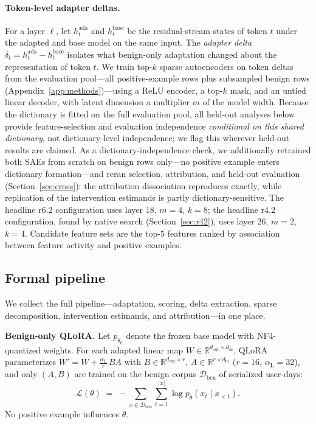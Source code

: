 \documentclass[10pt]{article} %
\newcommand{\rsix}{r6.2}
\newcommand{\rfour}{r4.2}
\begin{document}
\paragraph{Token-level adapter deltas.}
For a layer $\ell$, let $h^{\mathrm{ada}}_{t}$ and $h^{\mathrm{base}}_{t}$ be
the residual-stream states of token $t$ under the adapted and base model on the
same input. The \emph{adapter delta} $\delta_t = h^{\mathrm{ada}}_{t} -
h^{\mathrm{base}}_{t}$ isolates what benign-only adaptation changed about the
representation of token $t$. We train top-$k$ sparse autoencoders
\citep{gao2024scaling} on token deltas from the evaluation pool---all
positive-example rows plus subsampled benign rows
(Appendix~\ref{app:methods})---using a ReLU encoder, a top-$k$ mask, and an
untied linear decoder, with latent dimension a multiplier $m$ of the model
width. Because the dictionary is fitted on the full evaluation pool, all
held-out analyses below provide feature-selection and evaluation independence
\emph{conditional on this shared dictionary}, not dictionary-level
independence; we flag this wherever held-out results are claimed. As a
dictionary-independence check, we additionally retrained both SAEs from
scratch on benign rows only---no positive example enters dictionary
formation---and reran selection, attribution, and held-out evaluation
(Section~\ref{sec:cross}): the attribution dissociation reproduces exactly,
while replication of the intervention estimands is partly
dictionary-sensitive. The headline \rsix{} configuration uses layer $18$,
$m=4$, $k=8$; the headline \rfour{} configuration, found by native search
(Section~\ref{sec:r42}), uses layer $26$, $m=2$, $k=4$. Candidate feature sets
are the top-$5$ features ranked by association between feature activity and
positive examples.

\subsection{Formal pipeline}
\label{sec:formal}

We collect the full pipeline---adaptation, scoring, delta extraction, sparse
decomposition, intervention estimands, and attribution---in one place.

\textbf{Benign-only QLoRA.}
Let $p_{\theta_0}$ denote the frozen base model with NF4-quantized weights.
For each adapted linear map $W \in \mathbb{R}^{d_{\mathrm{out}} \times
d_{\mathrm{in}}}$, QLoRA parameterizes
$W' = W + \tfrac{\alpha_{\mathrm{L}}}{r}\,BA$ with
$B \in \mathbb{R}^{d_{\mathrm{out}} \times r}$,
$A \in \mathbb{R}^{r \times d_{\mathrm{in}}}$ ($r{=}16$,
$\alpha_{\mathrm{L}}{=}32$), and only $(A,B)$ are trained on the benign
corpus $\mathcal{D}_{\mathrm{ben}}$ of serialized user-days:
\begin{equation}
\mathcal{L}(\theta) \;=\; -\!\!\sum_{x \in \mathcal{D}_{\mathrm{ben}}}
\sum_{t=1}^{|x|} \log p_{\theta}\!\left(x_t \mid x_{<t}\right).
\end{equation}
No positive example influences $\theta$.
\end{document}
